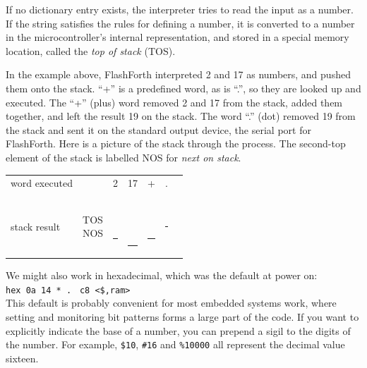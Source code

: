 \documentclass[12pt,a4paper]{article}
\begin{document}
\medskip
If no dictionary entry exists, the interpreter tries to read the input as a number.  
If the string satisfies the rules for defining a number, it is converted to a number
in the microcontroller's internal representation, and stored in a special memory location,
called the \textit{top of stack} (TOS).

\medskip
In the example above, FlashForth interpreted 2 and 17 as numbers, and pushed them onto the stack.
``+'' is a predefined word, as is ``.'', so they are looked up and executed.
The ``+'' (plus) word removed 2 and 17 from the stack, added them together, 
and left the result 19 on the stack. 
The word ``.'' (dot) removed 19 from the stack and sent it on the standard output device,
the serial port for FlashForth.
Here is a picture of the stack through the process.
The second-top element of the stack is labelled NOS for \textit{next on stack}.
\begin{center}
 \begin{tabular}{lc|ccccc}
 word executed & & 2 & 17 & + & . \\
 \\
 stack result  
 & \parbox[t]{35pt}{TOS \\ NOS} 
 & \parbox[t]{25pt}{ \\ \rule{20pt}{2pt}} 
 & \parbox[t]{25pt}{ \\  \\ \rule{20pt}{2pt}}
 & \parbox[t]{25pt}{ \\ \rule{20pt}{2pt}}
 & \parbox[t]{25pt}{\rule{20pt}{2pt}} \\
 \end{tabular}
\end{center}


\medskip
We might also work in hexadecimal, which was the default at power on: \vspace{7pt} \\
\verb!hex 0a 14 * . ! \fbox{$\hookleftarrow$} \verb!c8 <$,ram>! \vspace{7pt} \\
This default is probably convenient for most embedded systems work,
where setting and monitoring bit patterns forms a large part of the code.
If you want to explicitly indicate the base of a number, you can prepend a sigil to the
digits of the number.
For example, \verb!$10!, \verb!#16! and \verb!%10000! all represent the decimal value sixteen.
\end{document}

